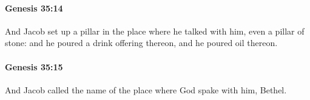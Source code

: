 		\paragraph{Genesis 35:14} %
			\label{GENESIS-35-14}

			And Jacob set up a pillar in the place where he talked with him, even a pillar of stone: and he poured a drink offering thereon, and he poured oil thereon.


		\paragraph{Genesis 35:15} %
			\label{GENESIS-35-15}

			And Jacob called the name of the place where God spake with him, Bethel.


